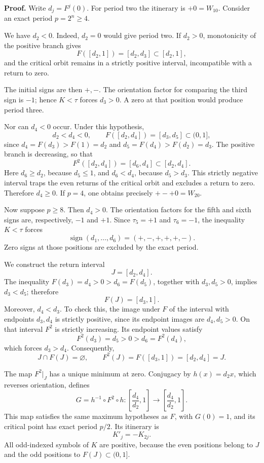\textbf{Proof.} Write \(d_j=F^j(0)\). For period two the itinerary is \(+0=W_10\). Consider an exact period \(p=2^n\ge4\).

We have \(d_2<0\). Indeed, \(d_2=0\) would give period two. If \(d_2>0\), monotonicity of the positive branch gives
\[
F([d_2,1])=[d_2,d_3]\subset[d_2,1],
\]
and the critical orbit remains in a strictly positive interval, incompatible with a return to zero.

The initial signs are then \(+,-\). The orientation factor for comparing the third sign is \(-1\); hence \(K<\tau\) forces \(d_3>0\). A zero at that position would produce period three.

Nor can \(d_4<0\) occur. Under this hypothesis,
\[
d_2<d_4<0,
\qquad F([d_2,d_4])=[d_3,d_5]\subset(0,1],
\]
since \(d_4=F(d_3)>F(1)=d_2\) and \(d_5=F(d_4)>F(d_2)=d_3\). The positive branch is decreasing, so that
\[
F^2([d_2,d_4])=[d_6,d_4]\subset[d_2,d_4].
\]
Here \(d_6\ge d_2\), because \(d_5\le1\), and \(d_6<d_4\), because \(d_5>d_3\). This strictly negative interval traps the even returns of the critical orbit and excludes a return to zero. Therefore \(d_4\ge0\). If \(p=4\), one obtains precisely \(+-+0=W_20\).

Now suppose \(p\ge8\). Then \(d_4>0\). The orientation factors for the fifth and sixth signs are, respectively, \(-1\) and \(+1\). Since \(\tau_5=+1\) and \(\tau_6=-1\), the inequality \(K<\tau\) forces
\begin{equation}
\operatorname{sign}(d_1,\ldots,d_6)=(+,-,+,+,+,-).
\label{hmtfg:clasificacion:eq:1}
\end{equation}
Zero signs at those positions are excluded by the exact period.

We construct the return interval
\[
J=[d_2,d_4].
\]
The inequality \(F(d_3)=d_4>0>d_6=F(d_5)\), together with \(d_3,d_5>0\), implies \(d_3<d_5\); therefore
\[
F(J)=[d_3,1].
\]
Moreover, \(d_4<d_3\). To check this, the image under \(F\) of the interval with endpoints \(d_3,d_4\) is strictly positive, since its endpoint images are \(d_4,d_5>0\). On that interval \(F^2\) is strictly increasing. Its endpoint values satisfy
\[
F^2(d_3)=d_5>0>d_6=F^2(d_4),
\]
which forces \(d_3>d_4\). Consequently,
\begin{equation}
J\cap F(J)=\varnothing,
\qquad F^2(J)=F([d_3,1])=[d_2,d_4]=J.
\label{hmtfg:clasificacion:eq:2}
\end{equation}

The map \(F^2|_J\) has a unique minimum at zero. Conjugacy by \(h(x)=d_2x\), which reverses orientation, defines
\begin{equation}
G=h^{-1}\circ F^2\circ h:
\left[\frac{d_4}{d_2},1\right]\longrightarrow
\left[\frac{d_4}{d_2},1\right].
\label{hmtfg:clasificacion:eq:3}
\end{equation}
This map satisfies the same maximum hypotheses as \(F\), with \(G(0)=1\), and its critical point has exact period \(p/2\). Its itinerary is
\begin{equation}
K'_j=-K_{2j}.
\label{hmtfg:clasificacion:eq:4}
\end{equation}
All odd-indexed symbols of \(K\) are positive, because the even positions belong to \(J\) and the odd positions to \(F(J)\subset(0,1]\).

